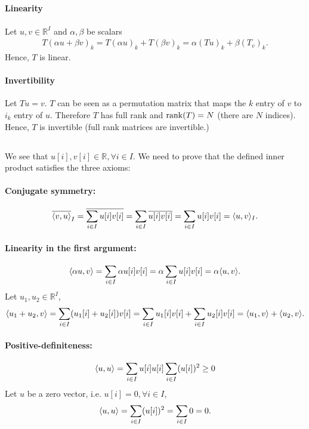 \subsection{}\label{subsec:p4-d}
\paragraph{Linearity} Let $u, v \in \mathbb{R}^I$ and $\alpha, \beta$ be scalars
\begin{align*}
	T(\alpha u + \beta v)_k = T(\alpha u)_k + T(\beta v)_k = \alpha (Tu)_k + \beta (T_v)_k.
\end{align*}
Hence, $T$ is linear.

\paragraph{Invertibility} Let $Tu = v$. $T$ can be seen as a permutation matrix that maps the $k$ entry of $v$ to $i_k$ entry of $u$. Therefore $T$ has full rank and $\operatorname{rank}(T) = N$ (there are $N$ indices). Hence, $T$ is invertible (full rank matrices are invertible.)


\subsection{}\label{subsec:p4-e}
We see that $u[i], v[i] \in \mathbb{R}, \forall i \in I$. We need to prove that the defined inner product satisfies the three axioms:

\paragraph{Conjugate symmetry:}
\[\overline{\langle v, u \rangle}_I = \overline{\sum_{i \in I} u[i]v[i]} = \sum_{i \in I} \overline{u[i]v[i]} = \sum_{i \in I} u[i]v[i] = \langle u, v \rangle_I.\]

\paragraph{Linearity in the first argument:}
\[\langle \alpha u, v \rangle = \sum_{i \in I} \alpha u[i]v[i] = \alpha \sum_{i \in I} u[i]v[i] = \alpha \langle u, v \rangle.\]
Let $u_1, u_2 \in \mathbb{R}^I$,
\[\langle u_1+u_2, v \rangle = \sum_{i \in I} (u_1[i]+u_2[i])v[i] = \sum_{i \in I} u_1[i]v[i] + \sum_{i \in I} u_2[i]v[i] = \langle u_1, v \rangle + \langle u_2, v \rangle.\]

\paragraph{Positive-definiteness:}
\[\langle u, u \rangle = \sum_{i \in I} u[i]u[i] \sum_{i \in I} (u[i])^2 \geq 0\]
Let $u$ be a zero vector, i.e. $u[i] = 0, \forall i \in I$,
\[\langle u, u \rangle = \sum_{i \in I} (u[i])^2 = \sum_{i \in I} 0 = 0.\]

